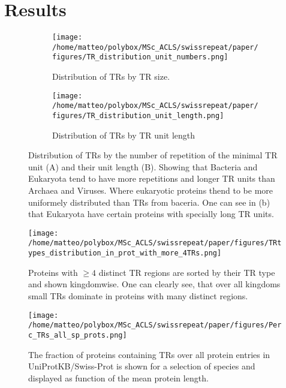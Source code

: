 \documentclass[a4,center,fleqn]{NAR}
\begin{document}
\section{Results}
\begin{figure*}[ht]
\centering
\begin{subfigure}{.5\textwidth}
  \centering
  \texttt{[image: /home/matteo/polybox/MSc\_ACLS/swissrepeat/paper/figures/TR\_distribution\_unit\_numbers.png]}
  \caption{Distribution of TRs by TR size.}
  \label{sup:figTR_distribution_unit_number}
\end{subfigure}%
\begin{subfigure}{.5\textwidth}
  \centering
  \texttt{[image: /home/matteo/polybox/MSc\_ACLS/swissrepeat/paper/figures/TR\_distribution\_unit\_length.png]}
  \caption{Distribution of TRs by TR unit length}
  \label{sup:figTR_distribution_unit_length}
\end{subfigure}
\caption{Distribution of TRs by the number of repetition of the minimal TR unit (A) and their unit length (B). Showing that Bacteria and Eukaryota tend to have more repetitions and longer TR units than Archaea and Viruses. Where eukaryotic proteins thend to be more uniformely distributed than TRs from baceria. One can see in (b) that Eukaryota have certain proteins with specially long TR units.}
\label{sup:figTR_distribution}
\end{figure*}

\begin{figure*}[ht]
\begin{center}
\texttt{[image: /home/matteo/polybox/MSc\_ACLS/swissrepeat/paper/figures/TRtypes\_distribution\_in\_prot\_with\_more\_4TRs.png]}
\end{center}
\caption{Proteins with $\geq 4$ distinct TR regions are sorted by their TR type and shown kingdomwise. One can clearly see, that over all kingdoms small TRs dominate in proteins with many distinct regions. }
\label{sup:figTRtypes_distribution_in_prot_with_more_4TRs}
\end{figure*}

\begin{figure*}[ht]
\begin{center}
\texttt{[image: /home/matteo/polybox/MSc\_ACLS/swissrepeat/paper/figures/Perc\_TRs\_all\_sp\_prots.png]}
\end{center}
\caption{The fraction of proteins containing TRs over all protein entries in UniProtKB/Swiss-Prot is shown for a selection of species and displayed as function of the mean protein length. 
}
\label{sup:figPerc_TRs_all_sp_prots}
\end{figure*}
\end{document}
